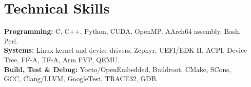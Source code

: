\section*{Technical Skills}
\textbf{Programming:} C, C++, Python, CUDA, OpenMP, AArch64 assembly, Bash, Perl.\\[2pt]
\textbf{Systems:} Linux kernel and device drivers, Zephyr, UEFI/EDK II, ACPI, Device Tree, FF-A, TF-A, Arm FVP, QEMU.\\[2pt]
\textbf{Build, Test \& Debug:} Yocto/OpenEmbedded, Buildroot, CMake, SCons, GCC, Clang/LLVM, GoogleTest, TRACE32, GDB.
